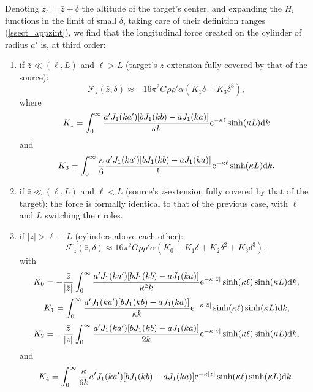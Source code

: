 \documentclass[12pt]{iopart}
\begin{document}
Denoting $z_s = \bar{z} + \delta$ the altitude of the target's center, and expanding the $H_i$ functions in the limit of small $\delta$, taking care of their definition ranges (\ref{ssect_appzint}), we find that the longitudinal force created on the cylinder of radius $a'$ is, at third order:
\begin{enumerate}
\item if $\bar{z}\ll(\ell,L)$ and $\ell > L$ (target's $z$-extension fully covered by that of the source):
\begin{equation} \label{eq_fzTaylorAD}
{\mathcal F}_z(\bar{z}, \delta) \approx -16\pi^2 G \rho \rho' \alpha (K_1 \delta + K_3 \delta^3),
\end{equation}
where
\begin{equation}
K_1 = \int_0^\infty \frac{a'J_1(ka') [bJ_1(kb) - aJ_1(ka)]}{\kappa k} {\rm e}^{-\kappa \ell} \sinh(\kappa L) {\rm d}k
\end{equation}
and
\begin{equation}
K_3 = \int_0^\infty \frac{\kappa}{6} \frac{a'J_1(ka') [bJ_1(kb) - aJ_1(ka)]}{k} {\rm e}^{-\kappa \ell} \sinh(\kappa L) {\rm d}k.
\end{equation}

\item if $\bar{z}\ll(\ell,L)$ and $\ell < L$ (source's $z$-extension fully covered by that of the target): the force is formally identical to that of the previous case, with $\ell$ and $L$ switching their roles.

\item if $|\bar{z}| > \ell + L$ (cylinders above each other):
\begin{equation} \label{eq_fzTaylorB}
{\mathcal F}_z(\bar{z}, \delta) \approx 16\pi^2 G \rho \rho' \alpha (K_0 + K_1 \delta + K_2 \delta^2 + K_3 \delta^3),
\end{equation}
with
\begin{equation}
K_0 = - \frac{\bar{z}}{|\bar{z}|} \int_0^\infty \frac{a'J_1(ka') [bJ_1(kb) - aJ_1(ka)]}{\kappa^2 k} {\rm e}^{-\kappa |\bar{z}|} \sinh(\kappa \ell) \sinh(\kappa L) {\rm d}k,
\end{equation}
\begin{equation}
K_1 = \int_0^\infty \frac{a'J_1(ka') [bJ_1(kb) - aJ_1(ka)]}{\kappa k} {\rm e}^{-\kappa |\bar{z}|} \sinh(\kappa \ell) \sinh(\kappa L) {\rm d}k,
\end{equation}
\begin{equation}
K_2 = - \frac{\bar{z}}{|\bar{z}|} \int_0^\infty \frac{a'J_1(ka') [bJ_1(kb) - aJ_1(ka)]}{2 k} {\rm e}^{-\kappa |\bar{z}|} \sinh(\kappa \ell) \sinh(\kappa L) {\rm d}k,
\end{equation}
and
\begin{equation}
K_4 = \int_0^\infty \frac{\kappa}{6k} a'J_1(ka') [bJ_1(kb) - aJ_1(ka)] {\rm e}^{-\kappa |\bar{z}|} \sinh(\kappa \ell) \sinh(\kappa L) {\rm d}k.
\end{equation}

\end{enumerate}
\end{document}
